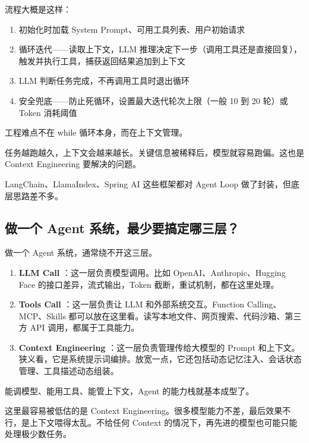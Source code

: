 \documentclass[10pt,a4paper]{ctexart}
\begin{document}
流程大概是这样：


\begin{enumerate}[itemsep=2pt, topsep=4pt]
  \item 初始化时加载 System Prompt、可用工具列表、用户初始请求
  \item 循环迭代——读取上下文，LLM 推理决定下一步（调用工具还是直接回复），触发并执行工具，捕获返回结果追加到上下文
  \item LLM 判断任务完成，不再调用工具时退出循环
  \item 安全兜底——防止死循环，设置最大迭代轮次上限（一般 10 到 20 轮）或 Token 消耗阈值
\end{enumerate}


工程难点不在 while 循环本身，而在上下文管理。



任务越跑越久，上下文会越来越长。关键信息被稀释后，模型就容易跑偏。这也是 Context Engineering 要解决的问题。



LangChain、LlamaIndex、Spring AI 这些框架都对 Agent Loop 做了封装，但底层思路差不多。



\subsection{做一个 Agent 系统，最少要搞定哪三层？}


做一个 Agent 系统，通常绕不开这三层。


\begin{enumerate}[itemsep=2pt, topsep=4pt]
  \item \textbf{LLM Call} ：这一层负责模型调用。比如 OpenAI、Anthropic、Hugging Face 的接口差异，流式输出，Token 截断，重试机制，都在这里处理。
  \item \textbf{Tools Call} ：这一层负责让 LLM 和外部系统交互。Function Calling、MCP、Skills 都可以放在这里看。读写本地文件、网页搜索、代码沙箱、第三方 API 调用，都属于工具能力。
  \item \textbf{Context Engineering} ：这一层负责管理传给大模型的 Prompt 和上下文。狭义看，它是系统提示词编排。放宽一点，它还包括动态记忆注入、会话状态管理、工具描述动态组装。
\end{enumerate}


能调模型、能用工具、能管上下文，Agent 的能力栈就基本成型了。



这里最容易被低估的是 Context Engineering。很多模型能力不差，最后效果不行，是上下文喂得太乱。不给任何 Context 的情况下，再先进的模型也可能只能处理极少数任务。
\end{document}
